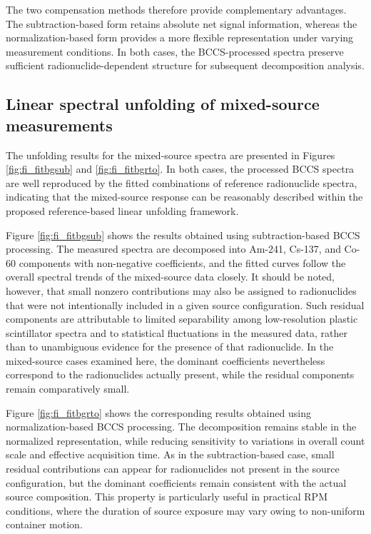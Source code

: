 \documentclass[fleqn, 10pt]{wlscirep}
\begin{document}
The two compensation methods therefore provide complementary advantages. The subtraction-based form retains absolute net signal information, whereas the normalization-based form provides a more flexible representation under varying measurement conditions. In both cases, the BCCS-processed spectra preserve sufficient radionuclide-dependent structure for subsequent decomposition analysis.


\subsection*{Linear spectral unfolding of mixed-source measurements}

The unfolding results for the mixed-source spectra are presented in Figures \ref{fig:fi_fitbgsub} and \ref{fig:fi_fitbgrto}. In both cases, the processed BCCS spectra are well reproduced by the fitted combinations of reference radionuclide spectra, indicating that the mixed-source response can be reasonably described within the proposed reference-based linear unfolding framework.

Figure \ref{fig:fi_fitbgsub} shows the results obtained using subtraction-based BCCS processing. The measured spectra are decomposed into Am-241, Cs-137, and Co-60 components with non-negative coefficients, and the fitted curves follow the overall spectral trends of the mixed-source data closely. It should be noted, however, that small nonzero contributions may also be assigned to radionuclides that were not intentionally included in a given source configuration. Such residual components are attributable to limited separability among low-resolution plastic scintillator spectra and to statistical fluctuations in the measured data, rather than to unambiguous evidence for the presence of that radionuclide. In the mixed-source cases examined here, the dominant coefficients nevertheless correspond to the radionuclides actually present, while the residual components remain comparatively small.

Figure \ref{fig:fi_fitbgrto} shows the corresponding results obtained using normalization-based BCCS processing. The decomposition remains stable in the normalized representation, while reducing sensitivity to variations in overall count scale and effective acquisition time. As in the subtraction-based case, small residual contributions can appear for radionuclides not present in the source configuration, but the dominant coefficients remain consistent with the actual source composition. This property is particularly useful in practical RPM conditions, where the duration of source exposure may vary owing to non-uniform container motion.
\end{document}
